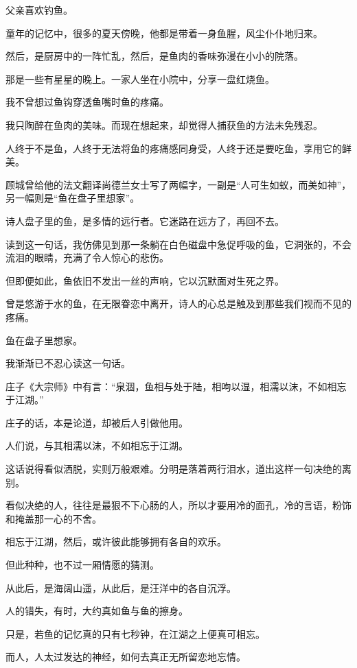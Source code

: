\documentclass[12pt,a4paper]{article}
\def\blankrev{\vspace{1ex}}									%
\begin{document}
		\blankrev
		父亲喜欢钓鱼。\par
		童年的记忆中，很多的夏天傍晚，他都是带着一身鱼腥，风尘仆仆地归来。\par
		然后，是厨房中的一阵忙乱，然后，是鱼肉的香味弥漫在小小的院落。\par
		那是一些有星星的晚上。一家人坐在小院中，分享一盘红烧鱼。

		\blankrev
		我不曾想过鱼钩穿透鱼嘴时鱼的疼痛。\par
		我只陶醉在鱼肉的美味。而现在想起来，却觉得人捕获鱼的方法未免残忍。\par
		人终于不是鱼，人终于无法将鱼的疼痛感同身受，人终于还是要吃鱼，享用它的鲜美。

		\blankrev
		顾城曾给他的法文翻译尚德兰女士写了两幅字，一副是“人可生如蚁，而美如神”，另一幅则是“鱼在盘子里想家”。\par
		诗人盘子里的鱼，是多情的远行者。它迷路在远方了，再回不去。\par
		读到这一句话，我仿佛见到那一条躺在白色磁盘中急促呼吸的鱼，它洞张的，不会流泪的眼睛，充满了令人惊心的悲伤。\par
		但即便如此，鱼依旧不发出一丝的声响，它以沉默面对生死之界。

		\blankrev
		曾是悠游于水的鱼，在无限眷恋中离开，诗人的心总是触及到那些我们视而不见的疼痛。\par
		鱼在盘子里想家。\par
		我渐渐已不忍心读这一句话。

		\blankrev
		庄子《大宗师》中有言：“泉涸，鱼相与处于陆，相呴以湿，相濡以沫，不如相忘于江湖。”\par
		庄子的话，本是论道，却被后人引做他用。

		\blankrev
		人们说，与其相濡以沫，不如相忘于江湖。

		\blankrev
		这话说得看似洒脱，实则万般艰难。分明是落着两行泪水，道出这样一句决绝的离别。\par
		看似决绝的人，往往是最狠不下心肠的人，所以才要用冷的面孔，冷的言语，粉饰和掩盖那一心的不舍。\par
		相忘于江湖，然后，或许彼此能够拥有各自的欢乐。\par
		但此种种，也不过一厢情愿的猜测。\par
		从此后，是海阔山遥，从此后，是汪洋中的各自沉浮。

		\blankrev
		人的错失，有时，大约真如鱼与鱼的擦身。\par
		只是，若鱼的记忆真的只有七秒钟，在江湖之上便真可相忘。\par
		而人，人太过发达的神经，如何去真正无所留恋地忘情。
\end{document}
